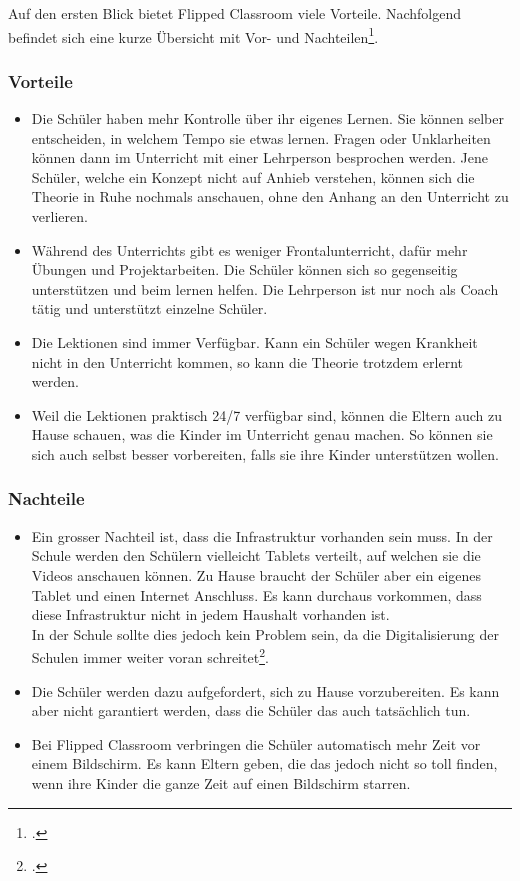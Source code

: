 Auf den ersten Blick bietet Flipped Classroom viele Vorteile. Nachfolgend befindet sich eine kurze Übersicht mit Vor- und Nachteilen\footcite{flipped_classroom_pro_con}.

\newpage
\subsubsection*{Vorteile}
\begin{itemize}
	\item Die Schüler haben mehr Kontrolle über ihr eigenes Lernen. Sie können selber entscheiden, in welchem Tempo sie etwas lernen. Fragen oder Unklarheiten können dann im Unterricht mit einer Lehrperson besprochen werden. Jene Schüler, welche ein Konzept nicht auf Anhieb verstehen, können sich die Theorie in Ruhe nochmals anschauen, ohne den Anhang an den Unterricht zu verlieren.
	\item Während des Unterrichts gibt es weniger Frontalunterricht, dafür mehr Übungen und Projektarbeiten. Die Schüler können sich so gegenseitig unterstützen und beim lernen helfen. Die Lehrperson ist nur noch als Coach tätig und unterstützt einzelne Schüler.
	\item Die Lektionen sind immer Verfügbar. Kann ein Schüler wegen Krankheit nicht in den Unterricht kommen, so kann die Theorie trotzdem erlernt werden. 
	\item Weil die Lektionen praktisch 24/7 verfügbar sind, können die Eltern auch zu Hause schauen, was die Kinder im Unterricht genau machen. So können sie sich auch selbst besser vorbereiten, falls sie ihre Kinder unterstützen wollen. 
\end{itemize}

\subsubsection*{Nachteile}
\begin{itemize}
	\item Ein grosser Nachteil ist, dass die Infrastruktur vorhanden sein muss. In der Schule werden den Schülern vielleicht Tablets verteilt, auf welchen sie die Videos anschauen können. Zu Hause braucht der Schüler aber ein eigenes Tablet und einen Internet Anschluss. Es kann durchaus vorkommen, dass diese Infrastruktur nicht in jedem Haushalt vorhanden ist. \\
	In der Schule sollte dies jedoch kein Problem sein, da die Digitalisierung der Schulen immer weiter voran schreitet\footcite{digitale_schule}.
	\item Die Schüler werden dazu aufgefordert, sich zu Hause vorzubereiten. Es kann aber nicht garantiert werden, dass die Schüler das auch tatsächlich tun.
	\item Bei Flipped Classroom verbringen die Schüler automatisch mehr Zeit vor einem Bildschirm. Es kann Eltern geben, die das jedoch nicht so toll finden, wenn ihre Kinder die ganze Zeit auf einen Bildschirm starren.
\end{itemize}


